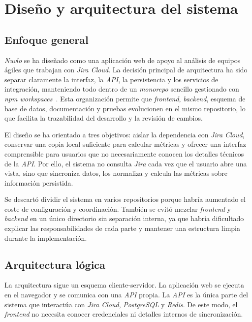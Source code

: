 \chapter{Diseño y arquitectura del sistema}


\section{Enfoque general}

\textit{Nuvlo} se ha diseñado como una aplicación web de apoyo al análisis de equipos ágiles que trabajan con \textit{Jira Cloud}. La decisión principal de arquitectura ha sido separar claramente la interfaz, la \textit{API}, la persistencia y los servicios de integración, manteniendo todo dentro de un \textit{monorepo} sencillo gestionado con \textit{npm workspaces}~\cite{NpmWorkspaces}. Esta organización permite que \textit{frontend}, \textit{backend}, esquema de base de datos, documentación y pruebas evolucionen en el mismo repositorio, lo que facilita la trazabilidad del desarrollo y la revisión de cambios.

El diseño se ha orientado a tres objetivos: aislar la dependencia con \textit{Jira Cloud}, conservar una copia local suficiente para calcular métricas y ofrecer una interfaz comprensible para usuarios que no necesariamente conocen los detalles técnicos de la \textit{API}. Por ello, el sistema no consulta \textit{Jira} cada vez que el usuario abre una vista, sino que sincroniza datos, los normaliza y calcula las métricas sobre información persistida.

Se descartó dividir el sistema en varios repositorios porque habría aumentado el coste de configuración y coordinación. También se evitó mezclar \textit{frontend} y \textit{backend} en un único directorio sin separación interna, ya que habría dificultado explicar las responsabilidades de cada parte y mantener una estructura limpia durante la implementación.

\section{Arquitectura lógica}

La arquitectura sigue un esquema cliente-servidor. La aplicación web se ejecuta en el navegador y se comunica con una \textit{API} propia. La \textit{API} es la única parte del sistema que interactúa con \textit{Jira Cloud}, \textit{PostgreSQL} y \textit{Redis}. De este modo, el \textit{frontend} no necesita conocer credenciales ni detalles internos de sincronización.

